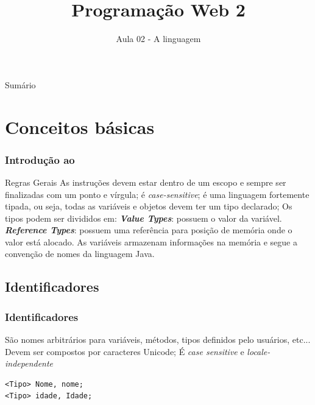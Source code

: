 \documentclass{beamer}
\title{Programação Web 2}
\subtitle{Aula 02 - A linguagem \CS}
\begin{document}
\begin{frame}[t]
	\maketitle
\end{frame}

\begin{frame}[t]{Sumário}
\tableofcontents
\end{frame}


\def\sectionname{}
\def\insertsectionnumber{}
\def\subsectionname{}
\def\insertsubsectionnumber{}
%
\AtBeginSection{\frame{\sectionpage}\addtocounter{framenumber}{-1}}
%
%








\section{Conceitos básicas}


\begin{frame}
\frametitle{Introdução ao \CS}
\begin{outline}
	\1 Regras Gerais
	\2 As instruções devem estar dentro de um escopo e sempre ser finalizadas com um ponto e vírgula;
	\2 \CS é \textit{case-sensitive};
	\2 \CS é uma linguagem fortemente tipada, ou seja, todas as variáveis e objetos devem ter um tipo declarado;
	\2 Os tipos podem ser divididos em:
	\3 \textbf{\textit{Value Types}}: possuem o valor da variável.
	\3 \textit{\textbf{Reference Types}}: possuem uma referência para posição de memória onde o valor está alocado.
	\2 As variáveis armazenam informações na memória e segue a convenção de nomes da linguagem Java.
	
\end{outline}
\end{frame}

\subsection{Identificadores}
\begin{frame}[fragile]
\frametitle{Identificadores}
\begin{outline}
	\1 São nomes arbitrários para variáveis, métodos, tipos definidos pelo usuários, etc...
	\1 Devem ser compostos por caracteres Unicode;
	\1 É \textit{case sensitive} e \textit{locale-independente}
\end{outline}
\begin{lstlisting}
<Tipo> Nome, nome;
<Tipo> idade, Idade;
\end{lstlisting}
\end{frame}
\end{document}
